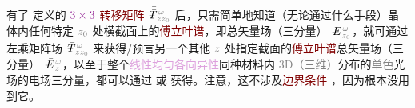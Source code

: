 有了  定义的 $\textcolor{Plum}{3 \times 3}$ \textcolor{Maroon}{转移矩阵} $\xint{\mathcolor{gray}{-}}{30}{\bar{\bar{T}}}^{\;\!\mathcolor{gray}{\omega}}_{\;\! \mathcolor{gray}{z} \mathcolor{gray}{z_0}}$ 后，只需简单地知道（无论通过什么手段）晶体内任何特定 $\mathcolor{gray}{z_0}$ 处横截面上的\textcolor{Maroon}{傅立叶谱}，即\textcolor{PineGreen}{总矢量场}（三分量） $\xint{\mathcolor{gray}{-}}{25}{\bar{E}}^{\;\!\mathcolor{gray}{\omega}}_{\;\! \mathcolor{gray}{z_0}}$，就可通过左乘矩阵场 $\xint{\mathcolor{gray}{-}}{30}{\bar{\bar{T}}}^{\;\!\mathcolor{gray}{\omega}}_{\;\! \mathcolor{gray}{z} \mathcolor{gray}{z_0}}$ 来获得/预言另一个其他 $\mathcolor{gray}{z}$ 处指定截面的\textcolor{Maroon}{傅立叶谱}\textcolor{PineGreen}{总矢量场}（三分量） $\xint{\mathcolor{gray}{-}}{25}{\bar{E}}^{\;\!\mathcolor{gray}{\omega}}_{\;\! \mathcolor{gray}{z}}$，以至于整个\textcolor{Plum}{线性}\textcolor{Plum}{均匀}\textcolor{Plum}{各向异性}同种材料内 \textcolor{gray}{3D（三维）}分布的\textcolor{gray}{单色}光场的电场三分量，都可以通过  或  获得。注意，这不涉及\textcolor{Maroon}{边界条件} ，因为根本没用到它。

